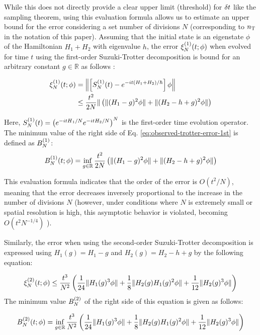 \documentclass[aip-draft.tex]{subfiles}
\begin{document}
While this does not directly provide a clear upper limit (threshold) for
$\delta t$ like the sampling theorem, using this evaluation formula allows us to
estimate an upper bound for the error considering a set number of divisions $N$
(corresponding to $n_{\mathrm{T}}$ in the notation of this paper). Assuming that the initial
state is an eigenstate $\phi$ of the Hamiltonian $H_1+H_2$ with eigenvalue $h$,
the error $\xi_{N}^{(1)}(t;\phi)$ when evolved for time $t$ using the first-order
Suzuki-Trotter decomposition is bound for an arbitrary constant
$g\in\mathbb{R}$ as follows \cite{Burgarth2024.PhysRevResearch.6.043155}:

\begin{align}
    \xi_{N}^{(1)}(t;\phi) &= \left\|\left[S_{N}^{(1)}(t)-e^{-it(H_1+H_2)/\hbar}\right]\phi\right\| \\
    &\leq \frac{t^2}{2N}\| \left(\|(H_1-g)^2\phi\|+\|(H_2-h+g)^2\phi\|\right)
    \label{eq:observed-trotter-error-1st}
\end{align}

Here, $S_{N}^{(1)}(t) = \left(e^{-i{tH}_1/N}e^{-itH_2/N}\right)^N$ is the first-order
time evolution operator. The minimum value of the right side of Eq.
\eqref{eq:observed-trotter-error-1st} is defined as $B_{N}^{(1)}$:
\begin{equation}
B_{N}^{(1)}(t;\phi)=\inf_{g\in\mathbb{R}}\frac{t^2}{2N}
    \left(\|(H_1-g)^2\phi\|+\|(H_2-h+g)^2\phi\|\right)
\label{eq:observed-trotter-error-bound-1st}
\end{equation}

This evaluation formula indicates that the order of the error is $O(t^2/N)$,
meaning that the error decreases inversely proportional to the increase in the
number of divisions $N$ (however, under conditions where $N$ is extremely small
or spatial resolution is high, this asymptotic behavior is violated, becoming
$O(t^2 N^{-1/4})$ \cite{Burgarth2024.PhysRevResearch.6.043155}).

Similarly, the error when using the second-order Suzuki-Trotter decomposition is
expressed using $H_1(g) = H_1-g$ and $H_2(g) = H_2-h+g$ by the following equation:

\begin{widetext}
\begin{equation}
  \xi_{N}^{(2)}(t;\phi)\leq\frac{t^3}{N^2}\left(\frac{1}{24}\|H_1(g)^3\phi\| + \frac{1}{8}\|H_2(g)H_1(g)^2\phi\|
  +\frac{1}{12}\|H_2(g)^3\phi\|\right)
    \label{eq:observed-trotter-error-2nd}
\end{equation}
The minimum value $B_{N}^{(2)}$ of the right side of this equation is given as follows:

\begin{equation}
B_{N}^{(2)}(t;\phi)=\inf_{g\in\mathbb{R}}\frac{t^3}{N^2}
    \left(\frac{1}{24}\|H_1(g)^3\phi\| + \frac{1}{8}\|H_2(g)H_1(g)^2\phi\|
  +\frac{1}{12}\|H_2(g)^3\phi\|\right)
\label{eq:observed-trotter-error-bound-2nd}
\end{equation}
\end{widetext}
\end{document}
